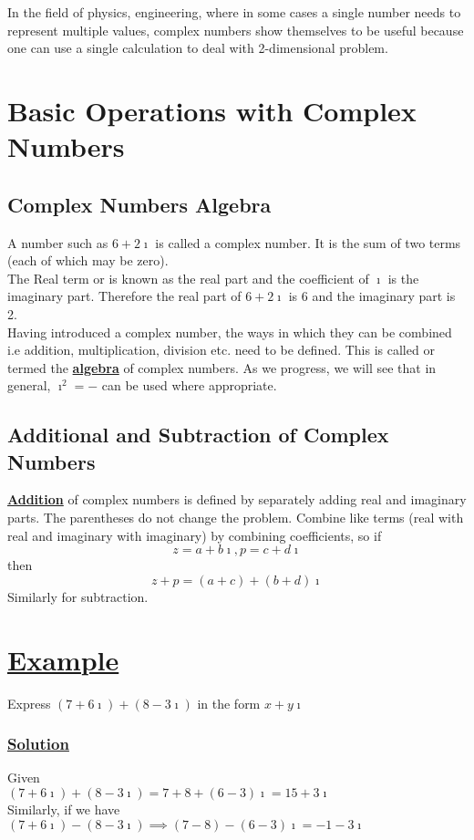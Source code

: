 \documentclass[11pt]{report}
\newcommand{\ubt}[1]{\textbf{\underline{#1}}}
\newcommand{\NI}{\noindent}
\newcommand{\imaginary}{\imath}
\newcommand{\example}[1]{\section*{\ubt{Example #1}}}
\newcommand{\solution}{\subsubsection{\ubt{Solution}}}
\begin{document}
	\NI In the field of physics, engineering, where in some cases a single number needs to represent multiple values, complex numbers show themselves to be useful because one can use a single calculation to deal with 2-dimensional problem.
	
	\section{Basic Operations with Complex Numbers}
	\subsection{Complex Numbers Algebra}
	A number such as $6+2\imaginary$ is called a complex number. It is the sum of two terms (each of which may be zero).\\
	
	\NI The Real term or is known as the real part and the coefficient of $\imaginary$ is the imaginary part. Therefore the real part of $6+2\imaginary$ is 6 and the imaginary part is 2.\\
	
	\NI Having introduced a complex number, the ways in which they can be combined i.e addition, multiplication, division etc. need to be defined. This is called or termed the \ubt{algebra} of complex numbers. As we progress, we will see that in general, $\imaginary^2 = -$ can be used where appropriate.
	
	\subsection{Additional and Subtraction of Complex Numbers}
	\ubt{Addition} of complex numbers is defined by separately adding real and imaginary parts. The parentheses do not change the problem. Combine like terms (real with real and imaginary with imaginary) by combining coefficients, so if
	\begin{equation}
		z=a+b\imaginary, p=c+d\imaginary\label{eq:1_11}
	\end{equation}
	then
	\begin{equation}
		z+p = (a+c) + (b+d)\imaginary\label{eq:1_12}
	\end{equation}
	Similarly for subtraction.
	\example{}
	Express $(7+6\imaginary) + (8-3\imaginary)$ in the form $x+y\imaginary$
	\solution
	Given\\
	$(7+6\imaginary) + (8-3\imaginary) = 7+8+(6-3)\imaginary = 15+3\imaginary$\\
	Similarly, if we have\\
	$(7+6\imaginary) - (8-3\imaginary)\implies (7-8) - (6-3)\imaginary = -1-3\imaginary$
	
\end{document}
